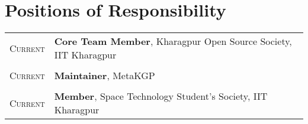 \documentclass[a4paper,10pt]{extarticle} %
\begin{document}


\vspace{-0.3cm}
\section{\textcolor{primary}{Positions of Responsibility}}

\begin{tabular}{r|p{16cm}}
  \textsc{Current} & \textbf{Core Team Member}, Kharagpur Open Source Society, IIT Kharagpur \\
  \multicolumn{2}{c}{} \\

\textsc{Current} & \textbf{Maintainer}, MetaKGP\\
\multicolumn{2}{c}{} \\

\textsc{Current} & \textbf{Member}, Space Technology Student's Society, IIT Kharagpur \\
\end{tabular}


\end{document}
